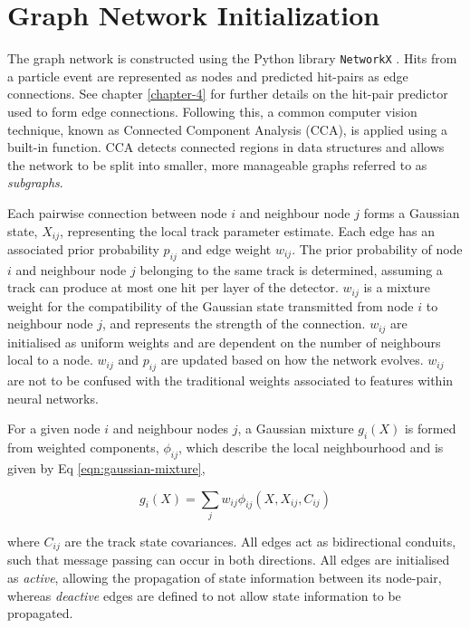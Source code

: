 \section{Graph Network Initialization}
\label{gnn-network-initialization}

The graph network is constructed using the Python library \texttt{NetworkX} \cite{SciPyProceedings_11}. Hits from a particle event are represented as nodes and predicted hit-pairs as edge connections. See chapter \ref{chapter-4} for further details on the hit-pair predictor used to form edge connections. Following this, a common computer vision technique, known as Connected Component Analysis (CCA), is applied using a built-in function\cite{networkx}. CCA detects connected regions in data structures and allows the network to be split into smaller, more manageable graphs referred to as \textit{subgraphs}. 

Each pairwise connection between node $i$ and neighbour node $j$ forms a Gaussian state, $X_{ij}$, representing the local track parameter estimate. Each edge has an associated prior probability $p_{ij}$ and edge weight $w_{ij}$. The prior probability of node $i$ and neighbour node $j$ belonging to the same track is determined, assuming a track can produce at most one hit per layer of the detector. $w_{ij}$ is a mixture weight for the compatibility of the Gaussian state transmitted from node $i$ to neighbour node $j$, and represents the strength of the connection. $w_{ij}$ are initialised as uniform weights and are dependent on the number of neighbours local to a node. $w_{ij}$ and $p_{ij}$ are updated based on how the network evolves. $w_{ij}$ are not to be confused with the traditional weights associated to features within neural networks.

For a given node $i$ and neighbour nodes $j$, a Gaussian mixture $g_i(X)$ is formed from weighted components, $\phi_{ij}$, which describe the local neighbourhood and is given by Eq \eqref{eqn:gaussian-mixture},

\begin{equation}
g_i(X) = \sum_{j} w_{ij}\phi_{ij}(X, X_{ij}, C_{ij})
\label{eqn:gaussian-mixture}
\end{equation}

where $C_{ij}$ are the track state covariances. All edges act as bidirectional conduits, such that message passing can occur in both directions. All edges are initialised as \textit{active}, allowing the propagation of state information between its node-pair, whereas \textit{deactive} edges are defined to not allow state information to be propagated. 


